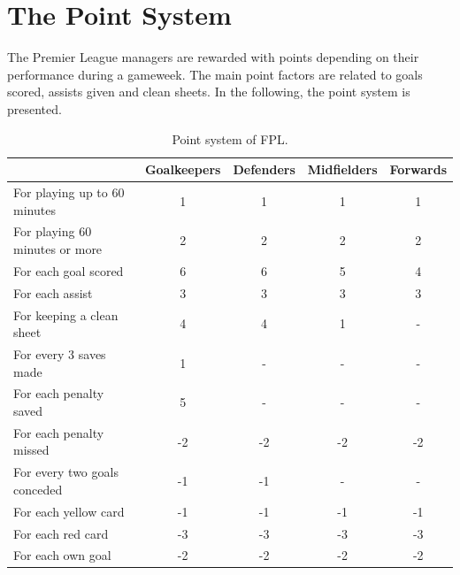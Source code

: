\section{The Point System} \label{point_system}

The Premier League managers are rewarded with points depending on their performance during a gameweek. The main point factors are related to goals scored, assists given and clean sheets. In the following, the point system is presented.

\begin{table}[H]
\centering
\small
\begin{tabular}{|l|c|c|c|c|}
\hline
                               & Goalkeepers & Defenders & Midfielders & Forwards \\
\hline
For playing up to 60 minutes   & 1           & 1         & 1           & 1        \\
For playing 60 minutes or more & 2           & 2         & 2           & 2        \\
For each goal scored           & 6           & 6         & 5           & 4        \\
For each assist                & 3           & 3         & 3           & 3        \\
For keeping a clean sheet      & 4           & 4         & 1           & -        \\
For every 3 saves made         & 1           & -         & -           & -        \\
For each penalty saved         & 5           & -         & -           & -        \\
For each penalty missed        & -2          & -2        & -2          & -2       \\
For every two goals conceded   & -1          & -1        & -           & -        \\
For each yellow card           & -1          & -1        & -1          & -1       \\
For each red card              & -3          & -3        & -3          & -3       \\
For each own goal              & -2          & -2        & -2          & -2      \\
\hline
\end{tabular}
\caption{Point system of FPL.}
\end{table}

